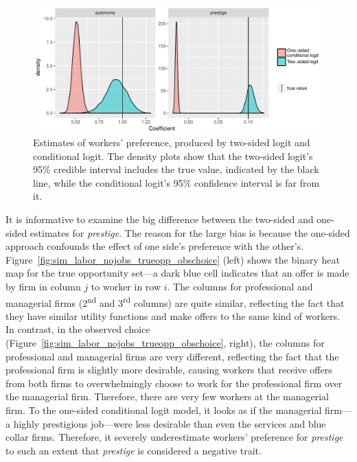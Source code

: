 \begin{figure}[tbp]
  \centering
  \includegraphics[width=\textwidth,keepaspectratio]{../figure/sim_labor_nojobs_alpha_tsl_vs_cl}
  \caption[Simulation, comparing the two-sided logit's and the one-sided
  conditional logit's estimate.]{Estimates of workers' preference, produced by
    two-sided logit and conditional logit. The density plots show that the
    two-sided logit's 95\% credible interval includes the true value, indicated
    by the black line, while the conditional logit's 95\% confidence interval is
    far from it.}
  \label{fig:sim_labor_nojobs_alpha_tsl_vs_cl}
\end{figure}

It is informative to examine the big difference between the two-sided and
one-sided estimates for \textit{prestige}. The reason for the large bias is
because the one-sided approach confounds the effect of one side's preference
with the other's. Figure~\ref{fig:sim_labor_nojobs_trueopp_obschoice} (left)
shows the binary heat map for the true opportunity set---a dark blue cell
indicates that an offer is made by firm in column $j$ to worker in row $i$. The
columns for professional and managerial firms (2\textsuperscript{nd} and
3\textsuperscript{rd} columns) are quite similar, reflecting the fact that they
have similar utility functions and make offers to the same kind of workers. In
contrast, in the observed choice
(Figure~\ref{fig:sim_labor_nojobs_trueopp_obschoice}, right), the columns for
professional and managerial firms are very different, reflecting the fact that
the professional firm is slightly more desirable, causing workers that receive
offers from both firms to overwhelmingly choose to work for the professional
firm over the managerial firm. Therefore, there are very few workers at the
managerial firm. To the one-sided conditional logit model, it looks as if the
managerial firm---a highly prestigious job---were less desirable than even the
services and blue collar firms. Therefore, it severely underestimate workers'
preference for \textit{prestige} to such an extent that \textit{prestige} is
considered a negative trait.

